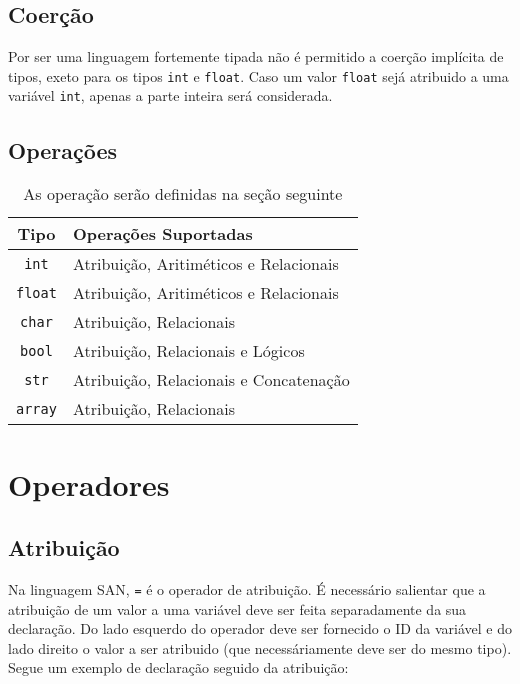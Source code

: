 \documentclass[a4paper,11pt]{article}
\begin{document}
\clearpage

\subsection{Coerção}
Por ser uma linguagem fortemente tipada não é permitido a coerção implícita de tipos, exeto para
os tipos \texttt{int} e \texttt{float}. Caso um valor \texttt{float} sejá atribuido a uma variável
\texttt{int}, apenas a parte inteira será considerada.

\subsection{Operações}
\begin{table}[h!]
    \centering
    \begin{tabular}{|c|l|}
         \hline
         \textbf{Tipo} & \textbf{Operações Suportadas}\\
         \hline
         \texttt{int} & Atribuição, Aritiméticos e Relacionais\\
         \hline
         \texttt{float} & Atribuição, Aritiméticos e Relacionais\\
         \hline
         \texttt{char} & Atribuição, Relacionais\\
         \hline
         \texttt{bool} & Atribuição, Relacionais e Lógicos\\
         \hline
         \texttt{str} & Atribuição, Relacionais e Concatenação\\
         \hline
         \texttt{array} & Atribuição, Relacionais\\
         \hline
    \end{tabular}
    \caption{As operação serão definidas na seção seguinte}
\end{table}

\section{Operadores}
\subsection{Atribuição}
Na linguagem SAN, \texttt{=} é o operador de atribuição. É necessário salientar que a atribuição
de um valor a uma variável deve ser feita separadamente da sua declaração. Do lado esquerdo do
operador deve ser fornecido o ID da variável e do lado direito o valor a ser atribuido (que
necessáriamente deve ser do mesmo tipo). Segue um exemplo de declaração seguido da atribuição:
\end{document}
